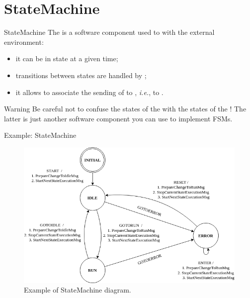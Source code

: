 
\section{StateMachine}
\graphicspath{{figs/section4/}}

\begin{frame}{StateMachine}
  The  is a software component used to  with the external environment:
	\begin{itemize}
		\item it can be in  state at a given time;
		\item transitions between states are handled by ;
		\item it allows to associate the sending of  to , \emph{i.e.}, to .
	\end{itemize}
	\begin{alertblock}{Warning}
		Be careful not to confuse the states of the  with the states of the ! The latter is just another software component you can use to implement FSMs.
	\end{alertblock}
\end{frame}

\begin{frame}{Example: StateMachine}
	\begin{figure}
		\centering
		\includegraphics[scale=.4]{statemachine.png}
		\caption{Example of StateMachine diagram.}
		\label{fig:statemachine}
	\end{figure}
\end{frame}

